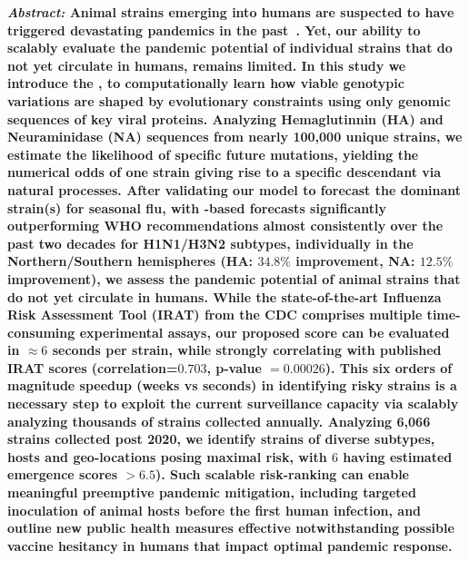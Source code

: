 \documentclass[onecolumn, compsoc,10pt]{IEEEtran}
\begin{document}
  
\maketitle

{\bf \sffamily \fontsize{10}{12}\selectfont \noindent   
  {\normalfont \itshape Abstract:} Animal \infl  strains emerging into humans %
  are suspected to have triggered devastating  pandemics in the past~\cite{shao2017evolution,mills2004transmissibility,reid2003origin,landolt2007up}. Yet, our  ability to  scalably  evaluate the pandemic potential of   individual strains that do not yet circulate in humans, remains limited. In this study we introduce the \enet,  to computationally learn how viable genotypic variations are shaped by   evolutionary constraints using only genomic sequences  of key viral proteins.  Analyzing    Hemaglutinnin (HA) and Neuraminidase (NA)  sequences from nearly 100,000  unique strains,  we estimate the likelihood of  specific future  mutations,   yielding the  numerical odds of one  strain giving rise to a specific descendant via natural %
  processes. After validating our model to forecast the dominant strain(s) for seasonal flu, with \enet-based forecasts significantly outperforming WHO recommendations almost consistently over the past two decades for  H1N1/H3N2 subtypes, individually in the Northern/Southern hemispheres (HA: $34.8\% $ improvement, NA: $12.5\%$ improvement), we assess  the pandemic potential  of  animal  strains that do not yet circulate in humans. While the state-of-the-art  Influenza Risk Assessment Tool (IRAT) from the CDC comprises multiple time-consuming experimental assays, our proposed \erisk score can be evaluated in $\approx 6$ seconds per strain, while strongly correlating with published IRAT scores (correlation=$0.703$, p-value $= 0.00026$). This  six orders of magnitude speedup (weeks vs seconds) in  identifying risky strains is a necessary step to exploit the  current surveillance capacity via scalably analyzing thousands of strains collected annually. Analyzing 6,066 \infl strains  collected post 2020, we  identify  strains of diverse subtypes,  hosts and geo-locations posing maximal  risk,  with $6$ having estimated  emergence scores $> 6.5$). Such scalable risk-ranking %
  can   enable  meaningful preemptive pandemic mitigation, including targeted inoculation of animal hosts before the first human infection, %
and  outline new public health measures effective notwithstanding possible vaccine hesitancy in humans that  impact optimal pandemic response.
}
  
\end{document}
